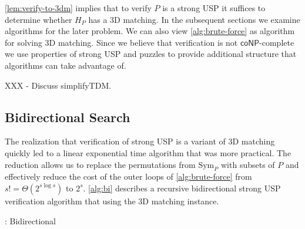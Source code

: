 \documentclass[11pt]{article}
\newcommand\Sym[1]{\ensuremath{\mathrm{Sym}_{#1}}}
\newcommand\coNP{\ensuremath{\mathsf{coNP}}}
\begin{document}
\autoref{lem:verify-to-3dm} implies that to verify $P$ is a strong USP
it suffices to determine whether $H_P$ has a 3D matching.  In the
subsequent sections we examine algorithms for the later problem.  We
can also view \autoref{alg:brute-force} as algorithm for solving 3D
matching.  Since we believe that verification is not \coNP-complete we
use properties of strong USP and puzzles to provide additional
structure that algorithms can take advantage of.

XXX - Discuss simplifyTDM.

\subsection{Bidirectional Search}

The realization that verification of strong USP is a variant of 3D
matching quickly led to a linear exponential time algorithm that was more practical.  The reduction allows us to replace the permutations
from $\Sym{P}$ with subsets of $P$ and effectively reduce the cost of
the outer loops of \autoref{alg:brute-force} from $s! =
\Theta(2^{s\log s})$ to $2^s$.  \autoref{alg:bi} describes a recursive
bidirectional strong USP verification algorithm that using the 3D matching instance.

\begin{algorithm}
  \caption{: Bidirectional}
  \label{alg:bi}
\begin{algorithmic}[1]
     
    \Else {}
        \Else {} \EndIf
    \EndIf
  \EndIf
   
      \EndIf
    \EndFor
  \EndFor
  \EndFunction

  \EndFunction
\end{algorithmic}
\end{algorithm}
\end{document}
